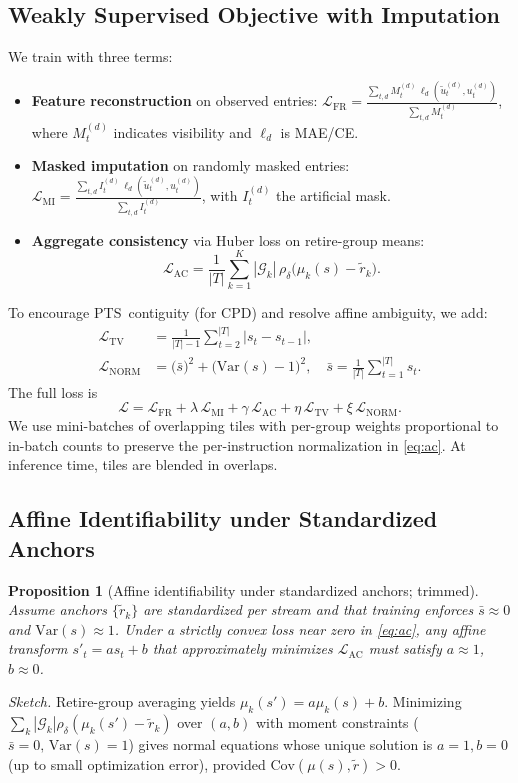 \documentclass[10pt,journal,compsoc]{IEEEtran}
\newcommand{\pts}{\textsc{PTS}}
\newcommand{\cpd}{\textsc{CPD}}
\newcommand{\Var}{\mathrm{Var}}
\newtheorem{proposition}{Proposition}
\begin{document}
\subsection{Weakly Supervised Objective with Imputation}
We train with three terms:
\begin{itemize}[leftmargin=*,nosep]
  \item \textbf{Feature reconstruction} on observed entries:
  \(
  \mathcal{L}_{\mathrm{FR}}
  =\frac{\sum_{t,d}M_t^{(d)}\,\ell_d(\tilde{u}_t^{(d)},u_t^{(d)})}{\sum_{t,d}M_t^{(d)}}
  \),
  where \(M_t^{(d)}\) indicates visibility and \(\ell_d\) is MAE/CE.
  \item \textbf{Masked imputation} on randomly masked entries:
  \(
  \mathcal{L}_{\mathrm{MI}}
  =\frac{\sum_{t,d}I_t^{(d)}\,\ell_d(\tilde{u}_t^{(d)},u_t^{(d)})}{\sum_{t,d}I_t^{(d)}}
  \),
  with \(I_t^{(d)}\) the artificial mask.
  \item \textbf{Aggregate consistency} via Huber loss on retire-group means:
  \begin{equation}
  \mathcal{L}_{\mathrm{AC}}
  =\frac{1}{|T|}\sum_{k=1}^K |\mathcal{G}_k|\,\rho_\delta\!\big(\mu_k(s)-\tilde{r}_k\big).
  \label{eq:ac}
  \end{equation}
\end{itemize}
To encourage \pts\ contiguity (for \cpd) and resolve affine ambiguity, we add:
\begin{align}
\mathcal{L}_{\mathrm{TV}} &=
\frac{1}{|T|-1}\sum_{t=2}^{|T|} |s_t-s_{t-1}|,
\\
\mathcal{L}_{\mathrm{NORM}} &=
\big(\bar{s}\big)^2+\big(\Var(s)-1\big)^2,\quad
\bar{s}=\tfrac{1}{|T|}\sum_{t=1}^{|T|} s_t.
\end{align}
The full loss is
\begin{equation}
\mathcal{L}
=\mathcal{L}_{\mathrm{FR}}
+\lambda\,\mathcal{L}_{\mathrm{MI}}
+\gamma\,\mathcal{L}_{\mathrm{AC}}
+\eta\,\mathcal{L}_{\mathrm{TV}}
+\xi\,\mathcal{L}_{\mathrm{NORM}}.
\label{eq:full}
\end{equation}
We use mini-batches of overlapping tiles with per-group weights proportional to in-batch counts to preserve the per-instruction normalization in \eqref{eq:ac}. At inference time, tiles are blended in overlaps.
\subsection{Affine Identifiability under Standardized Anchors}
\label{subsec:identifiability}
\begin{proposition}[Affine identifiability under standardized anchors; trimmed]
Assume anchors \(\{\tilde{r}_k\}\) are standardized per stream and that training enforces \(\bar{s}\approx 0\) and \(\Var(s)\approx 1\). Under a strictly convex loss near zero in \eqref{eq:ac}, any affine transform \(s'_t=a s_t+b\) that approximately minimizes \(\mathcal{L}_{\mathrm{AC}}\) must satisfy \(a\approx 1\), \(b\approx 0\).
\end{proposition}
\noindent\emph{Sketch.} Retire-group averaging yields \(\mu_k(s')=a\mu_k(s)+b\). Minimizing \(\sum_k|\mathcal{G}_k|\rho_\delta(\mu_k(s')-\tilde{r}_k)\) over \((a,b)\) with moment constraints (\(\bar{s}=0,\,\Var(s)=1\)) gives normal equations whose unique solution is \(a=1,b=0\) (up to small optimization error), provided \(\mathrm{Cov}(\mu(s),\tilde{r})>0\).
\end{document}
